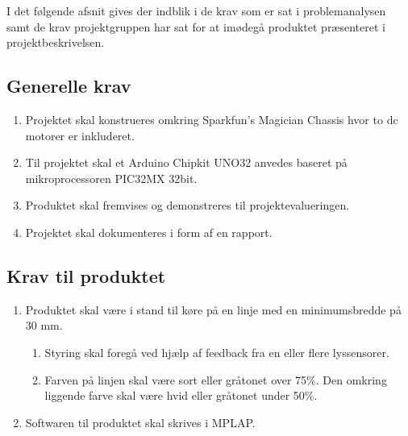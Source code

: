 I det følgende afsnit gives der indblik i de krav som er sat i problemanalysen samt de krav projektgruppen har sat for at imødegå produktet præsenteret i projektbeskrivelsen.

\subsection{Generelle krav}  
\begin{enumerate}
\item Projektet skal konstrueres omkring Sparkfun's Magician Chassis hvor to dc motorer er inkluderet.
\item Til projektet skal et Arduino Chipkit UNO32 anvedes baseret på mikroprocessoren PIC32MX 32bit.
\item Produktet skal fremvises og demonstreres til projektevalueringen.
\item Projektet skal dokumenteres i form af en rapport.
\end{enumerate}

\subsection{Krav til produktet}
\begin{enumerate}
\item Produktet skal være i stand til køre på en linje med en minimumsbredde på 30 mm. 
\begin{enumerate}
\item Styring skal foregå ved hjælp af feedback fra en eller flere lyssensorer.
\item Farven på linjen skal være sort eller gråtonet over 75\%.  Den omkring liggende farve skal være hvid eller gråtonet under 50\%.
\end{enumerate}
\item Softwaren til produktet skal skrives i MPLAP.
\end{enumerate}
